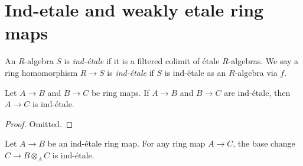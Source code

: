 

\section{Ind-etale and weakly etale ring maps}

\begin{definition}
    An $R$-algebra $S$ is \emph{ind-étale} if it is a filtered colimit of étale $R$-algebras.
    We say a ring homomorphism $R \to S$ is \emph{ind-étale} if $S$ is ind-étale as an $R$-algebra via $f$.
    \label{def:ind-etale}
\end{definition}

\begin{lemma}
  \label{thm:ind-etale-comp}
  Let $A \to B$ and $B \to C$ be ring maps. If $A \to B$ and $B \to C$ are ind-étale, then $A \to C$ is ind-étale.
\end{lemma}

\begin{proof}
  Omitted.
\end{proof}

\begin{lemma}
  \label{thm:ind-etale-base-change}
  Let $A \to B$ be an ind-étale ring map. For any ring map $A \to C$, the base change $C \to B \otimes_A C$ is ind-étale.
\end{lemma}

